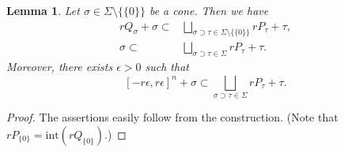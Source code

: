 \documentclass[12pt,a4]{amsart}
\newtheorem{lem}[thm]{Lemma}
\numberwithin{equation}{section}
\numberwithin{figure}{section}
\begin{document}
  \begin{lem}\label{lem for unimodular triangulation:label}
   Let $\sigma \in \Sigma \setminus \{ \{ 0 \} \} $ be a cone.
    Then we have 
    \begin{align*}
      rQ_{\sigma } +\sigma 
    \subset &
      \bigsqcup_{\sigma \supset \tau \in \Sigma \setminus \{ \{ 0 \} \}}  rP_{\tau} + \tau  , \\
     \sigma 
    \subset &
      \bigsqcup_{\sigma \supset \tau \in \Sigma }  rP_{\tau} + \tau .
    \end{align*}
  Moreover, 
   there exists $\epsilon >0$ such that 
  $$[-r\epsilon, r\epsilon]^n + \sigma 
    \subset 
      \bigsqcup_{\sigma \supset \tau \in \Sigma }  rP_{\tau} + \tau.
      $$
  \end{lem}
  \begin{proof}
  The assertions easily follow from the construction.
    (Note that $rP_{ \{ 0 \} } = \mathrm{int}  (rQ_{ \{ 0 \} })$.)
    \end{proof}
\end{document}
